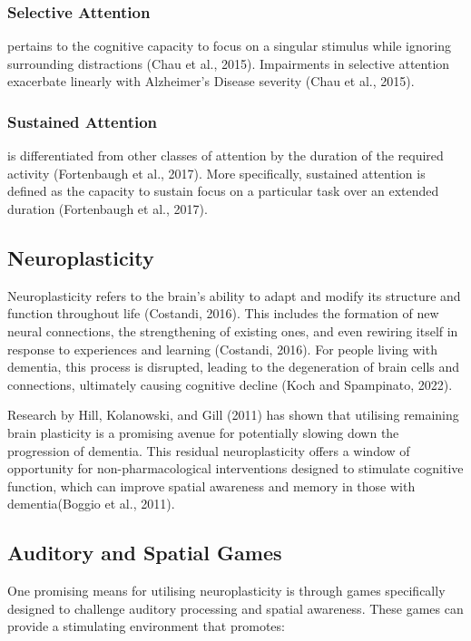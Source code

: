 \documentclass{l4proj}
\begin{document}
\subsubsection{Selective Attention}
pertains to the cognitive capacity to focus on a singular stimulus while ignoring surrounding distractions (Chau et al., 2015). Impairments in selective attention exacerbate linearly with Alzheimer’s Disease severity (Chau et al., 2015).

\subsubsection{Sustained Attention} is differentiated from other classes of attention by the duration of the required activity (Fortenbaugh et al., 2017). More specifically, sustained attention is defined as the capacity to sustain focus on a particular task over an extended duration (Fortenbaugh et al., 2017).

\subsection{Neuroplasticity}\label{sec:neuroplasticity}
Neuroplasticity refers to the brain's ability to adapt and modify its structure and function throughout life (Costandi, 2016). This includes the formation of new neural connections, the strengthening of existing ones, and even rewiring itself in response to experiences and learning (Costandi, 2016). For people living with dementia, this process is disrupted, leading to the degeneration of brain cells and connections, ultimately causing cognitive decline (Koch and Spampinato, 2022).

Research by Hill, Kolanowski, and Gill (2011) has shown that utilising remaining brain plasticity is a promising avenue for potentially slowing down the progression of dementia. This residual neuroplasticity offers a window of opportunity for non-pharmacological interventions designed to stimulate cognitive function, which can improve spatial awareness and memory in those with dementia(Boggio et al., 2011).

\subsection{Auditory and Spatial Games}
One promising means for utilising neuroplasticity is through games specifically designed to challenge auditory processing and spatial awareness. These games can provide a stimulating environment that promotes:
\end{document}
